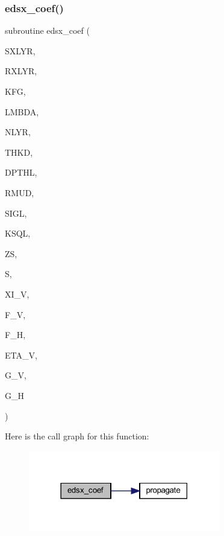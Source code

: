 \subsubsection{\texorpdfstring{edsx\+\_\+coef()}{edsx\_coef()}}
{\footnotesize\ttfamily subroutine edsx\+\_\+coef (\begin{DoxyParamCaption}\item[{integer}]{S\+X\+L\+YR,  }\item[{integer}]{R\+X\+L\+YR,  }\item[{integer}]{K\+FG,  }\item[{real(kind=ql)}]{L\+M\+B\+DA,  }\item[{integer}]{N\+L\+YR,  }\item[{real(kind=ql), dimension (nlyr)}]{T\+H\+KD,  }\item[{real(kind=ql), dimension (nlyr)}]{D\+P\+T\+HL,  }\item[{real(kind=ql), dimension(0\+:nlyr)}]{R\+M\+UD,  }\item[{complex(kind=ql), dimension (nlyr)}]{S\+I\+GL,  }\item[{complex(kind=ql), dimension (nlyr)}]{K\+S\+QL,  }\item[{real(kind=ql)}]{ZS,  }\item[{complex(kind=ql), dimension (0\+:nlyr)}]{S,  }\item[{complex(kind=ql)}]{X\+I\+\_\+V,  }\item[{complex(kind=ql)}]{F\+\_\+V,  }\item[{complex(kind=ql)}]{F\+\_\+H,  }\item[{complex(kind=ql)}]{E\+T\+A\+\_\+V,  }\item[{complex(kind=ql)}]{G\+\_\+V,  }\item[{complex(kind=ql)}]{G\+\_\+H }\end{DoxyParamCaption})}

Here is the call graph for this function\+:\nopagebreak
\begin{figure}[H]
\begin{center}
\leavevmode
\includegraphics[width=237pt]{Leroi__c_8f90_a2ffa10f72b064e2c52fb28da1b335098_cgraph}
\end{center}
\end{figure}
\mbox{\label{Leroi__c_8f90_a1b3954d66e2114dd2d6b6a5a44b7f0a4}} 
